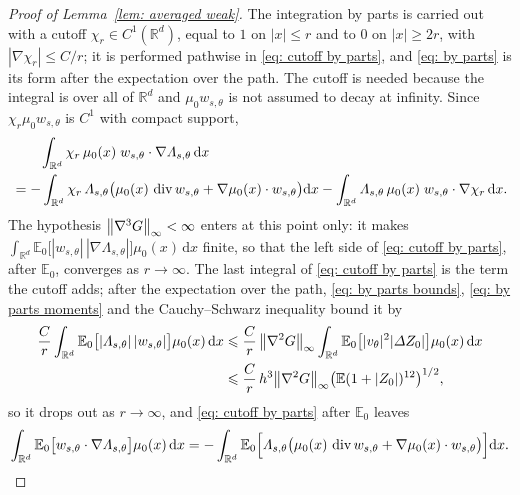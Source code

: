 \documentclass[namedate,webpdf,imanum]{ima-authoring-template}
\newcommand{\Le}{\leqslant}
\newcommand{\Ge}{\geqslant}
\newcommand{\D}{\mathrm{d}}
\theoremstyle{thmstyletwo}
\numberwithin{equation}{section}
\begin{document}
\begin{proof}[Proof of Lemma~\ref{lem: averaged weak}]
    The integration by parts is carried out with a cutoff $\chi_r \in C^1(\mathbb R^d)$, equal to $1$ on $|x| \Le r$ and to $0$ on $|x| \Ge 2r$, with $|\nabla \chi_r| \Le C/r$; it is performed pathwise in \eqref{eq: cutoff by parts}, and \eqref{eq: by parts} is its form after the expectation over the path. The cutoff is needed because the integral is over all of $\mathbb R^d$ and $\mu_0 w_{s,\theta}$ is not assumed to decay at infinity. Since $\chi_r \mu_0 w_{s,\theta}$ is $C^1$ with compact support,
    \begin{align}
        & \qquad \int_{\mathbb R^d} \chi_r\, \mu_0(x)\; w_{s,\theta} \cdot \nabla \Lambda_{s,\theta}\,\D x \notag \\
        & = - \int_{\mathbb R^d} \chi_r\, \Lambda_{s,\theta} \bigl( \mu_0(x)\, \operatorname{div} w_{s,\theta} + \nabla \mu_0(x) \cdot w_{s,\theta} \bigr) \D x - \int_{\mathbb R^d} \Lambda_{s,\theta}\, \mu_0(x)\; w_{s,\theta} \cdot \nabla \chi_r\,\D x .
        \label{eq: cutoff by parts}
    \end{align}
    The hypothesis $\norm{\nabla^3 G}_\infty < \infty$ enters at this point only: it makes $\int_{\mathbb R^d} \mathbb E_0 \bigl[ |w_{s,\theta}|\, |\nabla \Lambda_{s,\theta}| \bigr] \mu_0(x)\,\D x$ finite, so that the left side of \eqref{eq: cutoff by parts}, after $\mathbb E_0$, converges as $r \to \infty$. The last integral of \eqref{eq: cutoff by parts} is the term the cutoff adds; after the expectation over the path, \eqref{eq: by parts bounds}, \eqref{eq: by parts moments} and the Cauchy--Schwarz inequality bound it by
    \begin{align*}
        \frac{C}{r} \int_{\mathbb R^d} \mathbb E_0 \bigl[ |\Lambda_{s,\theta}|\, |w_{s,\theta}| \bigr] \mu_0(x)\,\D x
        & \Le \frac{C}{r}\, \norm{\nabla^2 G}_\infty \int_{\mathbb R^d} \mathbb E_0 \bigl[ |v_\theta|^2 |\Delta Z_0| \bigr] \mu_0(x)\,\D x \\
        & \Le \frac{C}{r}\, h^3 \norm{\nabla^2 G}_\infty \bigl( \mathbb E ( 1 + |Z_0| )^{12} \bigr)^{1/2} ,
    \end{align*}
    so it drops out as $r \to \infty$, and \eqref{eq: cutoff by parts} after $\mathbb E_0$ leaves
    \begin{equation}
        \int_{\mathbb R^d} \mathbb E_0 \bigl[ w_{s,\theta} \cdot \nabla \Lambda_{s,\theta} \bigr] \mu_0(x)\,\D x
        = - \int_{\mathbb R^d} \mathbb E_0 \Bigl[ \Lambda_{s,\theta} \bigl( \mu_0(x)\, \operatorname{div} w_{s,\theta} + \nabla \mu_0(x) \cdot w_{s,\theta} \bigr) \Bigr] \D x .
        \label{eq: by parts}
    \end{equation}

\end{proof}
\end{document}
